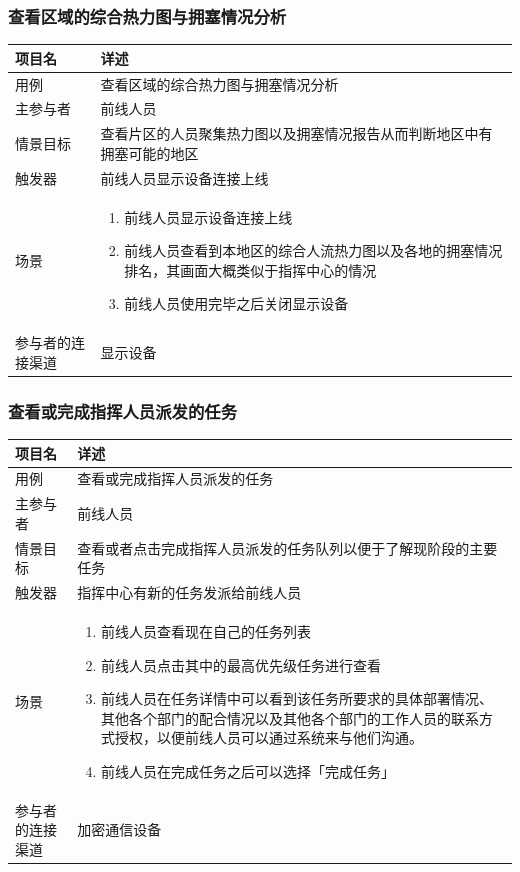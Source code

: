 \documentclass{ctexrep}
\begin{document}
\subsubsection{查看区域的综合热力图与拥塞情况分析}
\begin{longtable}{p{2cm} | p{10cm}}
\hline
项目名 & 详述 \\
\hline
\hline
用例 & 查看区域的综合热力图与拥塞情况分析\\
\hline
主参与者 & 前线人员  \\
\hline
情景目标 & 查看片区的人员聚集热力图以及拥塞情况报告从而判断地区中有拥塞可能的地区  \\
\hline
触发器 & 前线人员显示设备连接上线 \\
\hline
场景 & \begin{enumerate}
	\item 前线人员显示设备连接上线
	\item 前线人员查看到本地区的综合人流热力图以及各地的拥塞情况排名，其画面大概类似于指挥中心的情况
	\item 前线人员使用完毕之后关闭显示设备
\end{enumerate} \\
\hline
参与者的连接渠道 & 显示设备 \\
\hline
\end{longtable}

\subsubsection{查看或完成指挥人员派发的任务}
\begin{longtable}{p{2cm} | p{10cm}}
\hline
项目名 & 详述 \\
\hline
\hline
用例 &  查看或完成指挥人员派发的任务\\
\hline
主参与者 &前线人员  \\
\hline
情景目标 &查看或者点击完成指挥人员派发的任务队列以便于了解现阶段的主要任务  \\
\hline
触发器 & 指挥中心有新的任务发派给前线人员 \\
\hline
场景 & \begin{enumerate}
	\item 前线人员查看现在自己的任务列表
	\item 前线人员点击其中的最高优先级任务进行查看
	\item 前线人员在任务详情中可以看到该任务所要求的具体部署情况、其他各个部门的配合情况以及其他各个部门的工作人员的联系方式授权，以便前线人员可以通过系统来与他们沟通。
	\item 前线人员在完成任务之后可以选择「完成任务」
\end{enumerate} \\
\hline
参与者的连接渠道 & 加密通信设备\\
\hline
\end{longtable}
\end{document}
